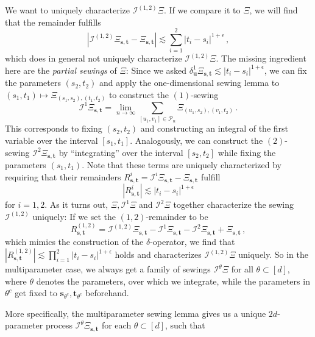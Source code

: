 \documentclass[11pt,oneside,english,reqno]{amsart}
\numberwithin{equation}{section}
\numberwithin{figure}{section}
\theoremstyle{plain}
\theoremstyle{definition}
\theoremstyle{remark}
\theoremstyle{plain}
\theoremstyle{plain}
\theoremstyle{plain}
\theoremstyle{plain}
\theoremstyle{plain}
\newcommand{\cI}{\mathcal{I}}
\newcommand{\cP}{\mathcal{P}}
\newcommand{\bu}{\mathbf{u}}
\newcommand{\bs}{\mathbf{s}}
\newcommand{\bt}{\mathbf{t}}
\newcommand{\abs}[1]{\left\lvert #1\right\rvert}
\begin{document}
We want to uniquely characterize $\cI^{(1,2)}\Xi$. If we compare it to $\Xi$, we will find that the remainder fulfills
%
\begin{equation*}
    \abs{\cI^{(1,2)}\Xi_{\bs,\bt}-\Xi_{\bs,\bt}}\lesssim\sum_{i=1}^2\abs{t_i-s_i}^{1+\epsilon}\,,
\end{equation*}
%
which does in general not uniquely characterize $\cI^{(1,2)}\Xi$. The missing ingredient here are the \emph{partial sewings} of $\Xi$: Since we asked $\delta^1_\bu\Xi_{\bs,\bt}\lesssim\abs{t_i-s_i}^{1+\epsilon}$, we can fix the parameters $(s_2,t_2)$ and apply the one-dimensional sewing lemma to $(s_1,t_1)\mapsto\Xi_{(s_1,s_2),(t_1,t_2)}$ to construct the $(1)$-sewing
%
\begin{equation*}
    \cI^{1}\Xi_{\bs,\bt} = \lim_{n\to\infty}\sum_{[u_1,v_1]\in\cP_n} \Xi_{(u_1,s_2),(v_1,t_2)}\,.
\end{equation*}
%
This corresponds to fixing $(s_2,t_2)$ and constructing an integral of the first variable over the interval $[s_1,t_1]$. Analogously, we can construct the $(2)$-sewing $\cI^{2}\Xi_{\bs,\bt}$ by ``integrating'' over the interval $[s_2,t_2]$ while fixing the parameters $(s_1,t_1)$. Note that these terms are uniquely characterized by requiring that their remainders $R^i_{\bs,\bt} = \cI^i\Xi_{\bs,\bt}-\Xi_{\bs,\bt}$ fulfill
%
\begin{equation*}
    \abs{R^i_{\bs,\bt}}\lesssim \abs{t_i-s_i}^{1+\epsilon}
\end{equation*}
%
for $i=1,2$. As it turns out, $\Xi, \cI^1\Xi$ and $\cI^2\Xi$ together characterize the sewing $\cI^{(1,2)}$ uniquely: If we set the $(1,2)$-remainder to be
%
\begin{equation*}
    R^{(1,2)}_{\bs,\bt} = \cI^{(1,2)}\Xi_{\bs,\bt}-\cI^{1}\Xi_{\bs,\bt}-\cI^{2}\Xi_{\bs,\bt}+\Xi_{\bs,\bt}\,,
\end{equation*}
%
which mimics the construction of the $\delta$-operator, we find that $\abs{R^{(1,2)}_{\bs,\bt}}\lesssim\prod_{i=1}^2 \abs{t_i-s_i}^{1+\epsilon}$ holds and characterizes $\cI^{(1,2)}\Xi$ uniquely. So in the multiparameter case, we always get a family of sewings $\cI^\theta\Xi$ for all $\theta \subset[d]$, where $\theta$ denotes the parameters, over which we integrate, while the parameters in $\theta^c$ get fixed to $\bs_{\theta^c},\bt_{\theta^c}$ beforehand. 

More specifically, the multiparameter sewing lemma gives us a unique $2d$-parameter process $\cI^\theta\Xi_{\bs,\bt}$ for each $\theta\subset[d]$, such that
\end{document}
